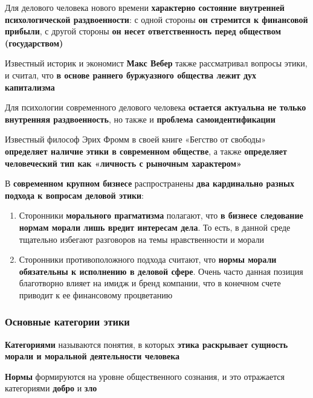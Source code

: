 Для делового человека нового времени \textbf{характерно состояние внутренней психологической раздвоенности}: с одной стороны \textbf{он стремится к финансовой прибыли}, с другой стороны \textbf{он несет ответственность перед обществом (государством)}

Известный историк и экономист \textbf{Макс Вебер} также рассматривал вопросы этики, и считал, что \textbf{в основе раннего буржуазного общества лежит дух капитализма}

Для психологии современного делового человека \textbf{остается актуальна не только внутренняя раздвоенность}, но также и \textbf{проблема самоидентификации}

Известный философ Эрих Фромм в своей книге «Бегство от свободы» \textbf{определяет наличие этики в современном обществе}, а также \textbf{определяет человеческий тип как «личность с рыночным характером»}

В \textbf{современном крупном бизнесе} распространены \textbf{два кардинально разных подхода к вопросам деловой этики}:

\begin{enumerate}
    \item Сторонники \textbf{морального прагматизма} полагают, что \textbf{в бизнесе следование нормам морали лишь вредит интересам дела}. То есть, в данной среде тщательно избегают разговоров на темы нравственности и морали
    \item Сторонники противоположного подхода считают, что \textbf{нормы морали обязательны к исполнению в деловой сфере}. Очень часто данная позиция благотворно влияет на имидж и бренд компании, что в конечном счете приводит к ее финансовому процветанию
\end{enumerate}

\subsubsection{Основные категории этики}

\begin{multienumerate}
\end{multienumerate}

\textbf{Категориями} называются понятия, в которых \textbf{этика раскрывает сущность морали и моральной деятельности человека}

\textbf{Нормы} формируются на уровне общественного сознания, и это отражается категориями \textbf{добро} и \textbf{зло}

